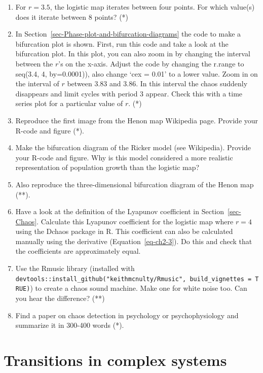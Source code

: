 \documentclass[
  a4paper,
  DIV=11,
  numbers=noendperiod,
  oneside]{scrreprt}
\begin{document}
\begin{enumerate}
\def\labelenumi{\arabic{enumi})}
\item
  For \(r=3.5\), the logistic map iterates between four points. For
  which value(s) does it iterate between 8 points? (*)
\item
  In Section~\ref{sec-Phase-plot-and-bifurcation-diagrams} the code to
  make a bifurcation plot is shown. First, run this code and take a look
  at the bifurcation plot. In this plot, you can also zoom in by
  changing the interval between the \(r\)'s on the x-axis. Adjust the
  code by changing the r.range to seq(3.4, 4, by=0.0001)), also change
  `cex = 0.01' to a lower value. Zoom in on the interval of \(r\)
  between 3.83 and 3.86. In this interval the chaos suddenly disappears
  and limit cycles with period 3 appear. Check this with a time series
  plot for a particular value of \(r\). (*)
\item
  Reproduce the first image from the Henon map Wikipedia page. Provide
  your R-code and figure (*).
\item
  Make the bifurcation diagram of the Ricker model (see Wikipedia).
  Provide your R-code and figure. Why is this model considered a more
  realistic representation of population growth than the logistic map?
\item
  Also reproduce the three-dimensional bifurcation diagram of the Henon
  map (**).
\item
  Have a look at the definition of the Lyapunov coefficient in
  Section~\ref{sec-Chaos}. Calculate this Lyapunov coefficient for the
  logistic map where \(r = 4\) using the Dchaos package in R. This
  coefficient can also be calculated manually using the derivative
  (Equation~\ref{eq-ch2-3}). Do this and check that the coefficients are
  approximately equal.
\item
  Use the Rmusic library (installed with
  \texttt{devtools::install\_github("keithmcnulty/Rmusic",\ build\_vignettes\ =\ TRUE)})
  to create a chaos sound machine. Make one for white noise too. Can you
  hear the difference? (**)
\item
  Find a paper on chaos detection in psychology or psychophysiology and
  summarize it in 300-400 words (*).
\end{enumerate}


\hypertarget{sec-ch3}{%
\chapter{Transitions in complex systems}\label{sec-ch3}}
\end{document}

